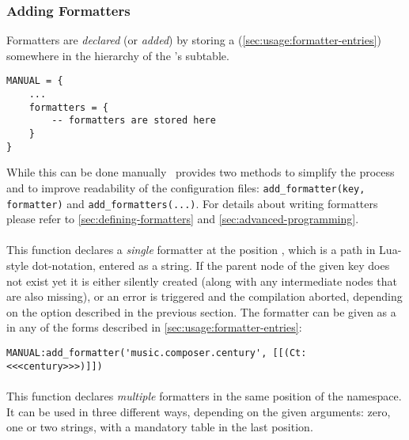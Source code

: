 \documentclass[12pt]{scrartcl}
\begin{document}
\subsubsection{Adding Formatters}
\label{sec:usage-adding-formatters}

Formatters are \emph{declared} (or \emph{added}) by storing a  (\vref{sec:usage:formatter-entries}) somewhere in the hierarchy of the
's  subtable.

\begin{verbatim}
MANUAL = {
	...
	formatters = {
		-- formatters are stored here
	}
}
\end{verbatim}

\noindent While this can be done manually \luaformatters\ provides two methods to
simplify the process and to improve readability of the configuration files:
\texttt{add_formatter(key, formatter)} and
\texttt{add_formatters(...)}.  For details about writing formatters
please refer to \vref{sec:defining-formatters} and
\vref{sec:advanced-programming}.


\paragraph{}

This function declares a \emph{single} formatter at the position ,
which is a path in Lua-style dot-notation, entered as a string.  If the parent
node of the given key does not exist yet it is either silently created (along
with any intermediate nodes that are also missing), or an error is triggered and
the compilation aborted, depending on the  option described in
the previous section. The formatter can be given as a  in
any of the forms described in \vref{sec:usage:formatter-entries}:

\begin{verbatim}
MANUAL:add_formatter('music.composer.century', [[(Ct: <<<century>>>)]])
\end{verbatim}

\paragraph{}

This function declares \emph{multiple} formatters in the same position of the namespace.  It can be used in three different ways, depending on the given arguments: zero, one or two strings, with a mandatory table in the last position.
\end{document}
